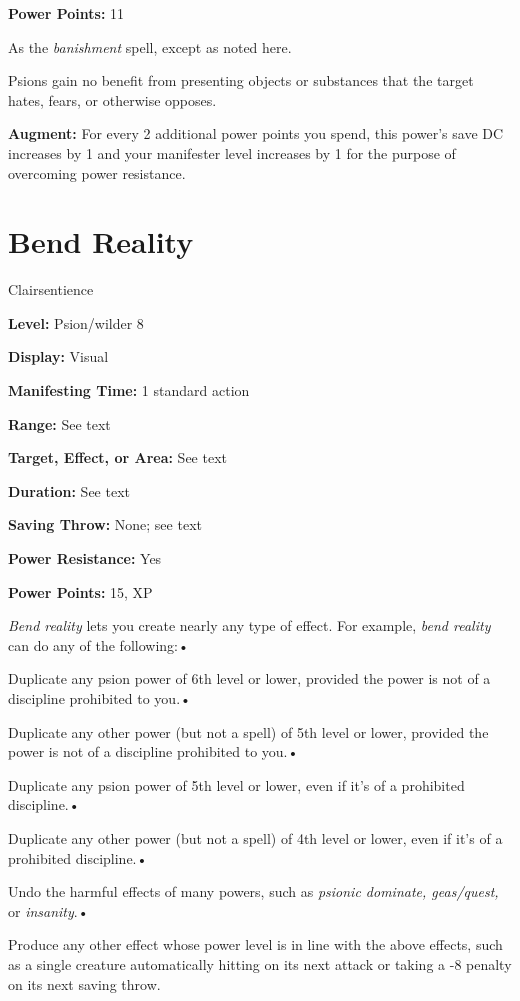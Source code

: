 \documentclass{article}
\begin{document}
\textbf{Power Points:} 11

As the \textit{banishment }spell, except as noted here. 

Psions gain no benefit from presenting objects or substances that the target hates, 
fears, or otherwise opposes.

\textbf{Augment:} For every 2 additional power points you spend, this power's save 
DC increases by 1 and your manifester level increases by 1 for the purpose of overcoming 
power resistance.

\vspace{12pt}
\section*{Bend Reality}

Clairsentience

\textbf{Level:} Psion/wilder 8

\textbf{Display:} Visual

\textbf{Manifesting Time:} 1 standard action

\textbf{Range:} See text

\textbf{Target, Effect, or Area:} See text

\textbf{Duration:} See text

\textbf{Saving Throw:} None; see text

\textbf{Power Resistance:} Yes

\textbf{Power Points:} 15, XP

\textit{Bend reality }lets you create nearly any type of effect. For example, \textit{bend 
reality }can do any of the following:• 

\parindent=3pt
Duplicate any psion power of 6th level or lower, provided the power is not of a 
discipline prohibited to you.• 

Duplicate any other power (but not a spell) of 5th level or lower, provided the 
power is not of a discipline prohibited to you.• 

\parindent=7pt
Duplicate any psion power of 5th level or lower, even if it's of a prohibited discipline.• 

\parindent=3pt
Duplicate any other power (but not a spell) of 4th level or lower, even if it's 
of a prohibited discipline.• 

Undo the harmful effects of many powers, such as \textit{psionic dominate, geas/quest, 
}or \textit{insanity}.• 

Produce any other effect whose power level is in line with the above effects, such 
as a single creature automatically hitting on its next attack or taking a -8 penalty 
on its next saving throw. 
\end{document}
